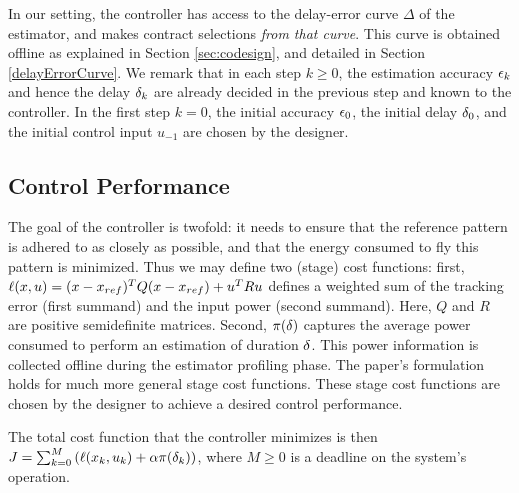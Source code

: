 In our setting, the controller has access to the delay-error curve $\Delta$ of the estimator, and makes contract selections \emph{from that curve}.
This curve is obtained offline as explained in Section \ref{sec:codesign}, and detailed in Section \ref{delayErrorCurve}.
We remark that in each step $k\geq0$, the estimation accuracy $\epsilon_k$
and hence the delay $\delta_k$ are already decided in the previous
step and known to the controller.
In the first step $k=0$, the
initial accuracy $\epsilon_0$, the initial delay $\delta_0$, and
the initial control input $u_{-1}$ are chosen by the designer.

\subsection{Control Performance}
The goal of the controller is twofold: it needs to ensure that the reference pattern is adhered to as closely as possible, and that the energy consumed to fly this pattern is minimized.
Thus we may define two (stage) cost functions: first, $\ell(x, u) = (x - x_{ref})^TQ(x - x_{ref}) + u^T R u$ defines a weighted sum of the tracking error (first summand) and the input power (second summand).
Here, $Q$ and $R$ are positive semidefinite matrices.
Second, $\pi(\delta)$ captures the average power consumed to perform an estimation of duration $\delta$.
This power information is collected offline during the estimator profiling phase.
The paper's formulation holds for much more general stage cost functions.
These stage cost functions are chosen by the designer to achieve a desired control performance.

The total cost function that the controller minimizes is then
\(
J=\sum_{k=0}^{M}\left(\ell(x_k,u_k)+ \alpha \pi(\delta_k)\right)
\),
where $M \geq 0$ is a deadline on the system's operation.

